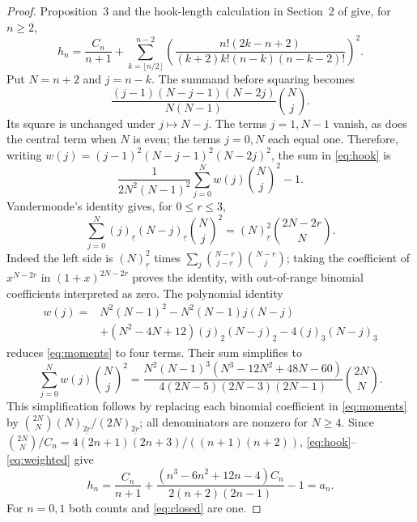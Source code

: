 \documentclass[10pt]{article}
\begin{document}
\begin{proof}
Proposition~3 and the hook-length calculation in Section~2 of
\cite{almost} give, for $n\geq2$,
\begin{equation}
 h_n=\frac{C_n}{n+1}+\sum_{k=\lfloor n/2\rfloor}^{n-2}
 \left(\frac{n!(2k-n+2)}{(k+2)k!(n-k)(n-k-2)!}\right)^2.
 \label{eq:hook}
\end{equation}
Put $N=n+2$ and $j=n-k$. The summand before squaring becomes
\[
 \frac{(j-1)(N-j-1)(N-2j)}{N(N-1)}\binom Nj.
\]
Its square is unchanged under $j\mapsto N-j$. The terms $j=1,N-1$
vanish, as does the central term when $N$ is even; the terms $j=0,N$
each equal one. Therefore, writing
$w(j)=(j-1)^2(N-j-1)^2(N-2j)^2$, the sum in \eqref{eq:hook} is
\begin{equation}
 \frac{1}{2N^2(N-1)^2}\sum_{j=0}^N w(j)\binom Nj^2-1.
 \label{eq:half-sum}
\end{equation}
Vandermonde's identity gives, for $0\leq r\leq3$,
\begin{equation}
 \sum_{j=0}^N(j)_{\underline r}(N-j)_{\underline r}\binom Nj^2
 =(N)_{\underline r}^2\binom{2N-2r}{N}.
 \label{eq:moments}
\end{equation}
Indeed the left side is $(N)_{\underline r}^2$ times
$\sum_j\binom{N-r}{j-r}\binom{N-r}{j}$; taking the coefficient of
$x^{N-2r}$ in $(1+x)^{2N-2r}$ proves the identity, with out-of-range
binomial coefficients interpreted as zero.
The polynomial identity
\begin{align*}
 w(j)={}&N^2(N-1)^2-N^2(N-1)j(N-j)\\
 &+(N^2-4N+12)(j)_{\underline2}(N-j)_{\underline2}
       -4(j)_{\underline3}(N-j)_{\underline3}
\end{align*}
reduces \eqref{eq:moments} to four terms. Their sum simplifies to
\begin{equation}
 \sum_{j=0}^N w(j)\binom Nj^2
 =\frac{N^2(N-1)^3(N^3-12N^2+48N-60)}
 {4(2N-5)(2N-3)(2N-1)}\binom{2N}{N}.
 \label{eq:weighted}
\end{equation}
This simplification follows by replacing each binomial coefficient in
\eqref{eq:moments} by
$\binom{2N}{N}(N)_{\underline{2r}}/(2N)_{\underline{2r}}$;
all denominators are nonzero for $N\geq4$.
Since $\binom{2N}{N}/C_n=4(2n+1)(2n+3)/((n+1)(n+2))$,
\eqref{eq:hook}--\eqref{eq:weighted} give
\[
 h_n=\frac{C_n}{n+1}
 +\frac{(n^3-6n^2+12n-4)C_n}{2(n+2)(2n-1)}-1=a_n.
\]
For $n=0,1$ both counts and \eqref{eq:closed} are one.
\end{proof}
\end{document}
